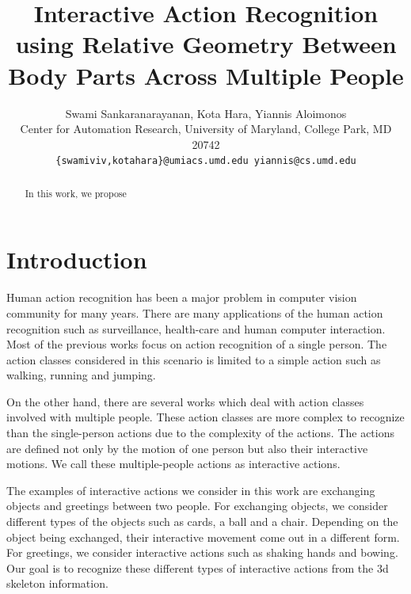 \documentclass[10pt,twocolumn,letterpaper]{article}
\begin{document}
\title{Interactive Action Recognition using Relative Geometry Between Body Parts Across Multiple People}

\author{Swami Sankaranarayanan, Kota Hara, Yiannis Aloimonos\\
Center for Automation Research, University of Maryland, College Park, MD 20742\\
{\tt\small \{swamiviv,kotahara\}@umiacs.umd.edu yiannis@cs.umd.edu}
}


\maketitle

\begin{abstract}
In this work, we propose
   
\end{abstract}

\section{Introduction}
Human action recognition has been a major problem in computer vision community for many years. There are many applications of the human action recognition such as surveillance, health-care and human computer interaction. Most of the previous works focus on action recognition of a single person. The action classes considered in this scenario is limited to a simple action such as walking, running and jumping. 

On the other hand, there are several works which deal with action classes involved with multiple people. These action classes are more complex to recognize than the single-person actions due to the complexity of the actions. The actions are defined not only by the motion of one person but also their interactive motions. We call these multiple-people actions as interactive actions.

The examples of interactive actions we consider in this work are exchanging objects and greetings between two people. For exchanging objects, we consider different types of the objects such as cards, a ball and a chair. Depending on the object being exchanged, their interactive movement come out in a different form. For greetings, we consider interactive actions such as shaking hands and bowing. Our goal is to recognize these different types of interactive actions from the 3d skeleton information.
\end{document}
